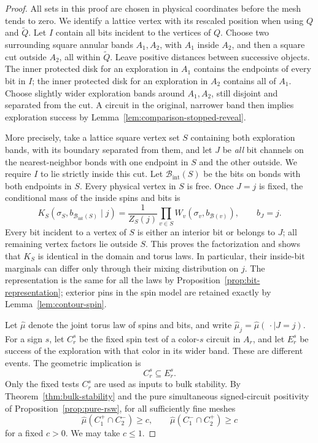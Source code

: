 \begin{proof}
All sets in this proof are chosen in physical coordinates before the
mesh tends to zero.  We identify a lattice vertex with its rescaled
position when using \(Q\) and \(\widetilde Q\).  Let \(I\) contain all
bits incident to the vertices of \(Q\).  Choose two surrounding square
annular bands \(A_1,A_2\), with \(A_1\) inside \(A_2\), and then a
square cut outside \(A_2\), all within \(\widetilde Q\).  Leave positive
distances between successive objects.  The inner protected disk for an
exploration in \(A_1\) contains the endpoints of every bit in \(I\);
the inner protected disk for an exploration in \(A_2\) contains all of
\(A_1\).  Choose slightly wider exploration bands around \(A_1,A_2\),
still disjoint and separated from the cut.  A circuit in the original,
narrower band then implies exploration success by
Lemma~\ref{lem:comparison-stopped-reveal}.

More precisely, take a lattice square vertex set \(S\) containing both
exploration bands, with its boundary separated from them, and let \(J\)
be \emph{all} bit channels on the
nearest-neighbor bonds with one endpoint in \(S\) and the other outside.
We require \(I\) to lie strictly inside this cut.  Let
\(\mathcal B_{\mathrm{int}}(S)\) be the bits on bonds with both endpoints
in \(S\).  Every physical vertex in \(S\) is free.  Once \(J=j\) is
fixed, the conditional mass of the inside spins and bits is
\[
 K_S(\sigma_S,b_{\mathcal B_{\mathrm{int}}(S)}\mid j)
 =\frac1{Z_S(j)}\prod_{v\in S}W_v(\sigma_v,b_{\mathcal B(v)}),
 \qquad b_J=j.
\]
Every bit incident to a vertex of \(S\) is either an interior bit or
belongs to \(J\); all remaining vertex factors lie outside \(S\).
This proves the factorization and shows that \(K_S\) is identical in
the domain and torus laws.  In particular, their inside-bit marginals
can differ only through their mixing distribution on \(j\).
The representation is the same for all the laws by
Proposition~\ref{prop:bit-representation}; exterior pins in the spin
model are retained exactly by Lemma~\ref{lem:contour-spin}.

Let \(\widehat\mu\) denote the joint torus law of spins and bits, and
write \(\widehat\mu_j=\widehat\mu(\,\cdot\mid J=j)\).  For a sign
\(s\), let \(C_r^s\) be the fixed spin test of a color-\(s\) circuit in
\(A_r\), and let \(E_r^s\) be success of the exploration with that
color in its wider band.  These are different events.  The geometric
implication is
\begin{equation}
 C_r^s\subseteq E_r^s.
 \label{eq:comparison-circuit-success}
\end{equation}
Only the fixed tests \(C_r^s\) are used as inputs to bulk stability.
By Theorem~\ref{thm:bulk-stability} and the pure simultaneous
signed-circuit positivity of Proposition~\ref{prop:pure-rsw}, for all
sufficiently fine meshes
\begin{equation}
 \widehat\mu(C_1^+\cap C_2^-)
 \ge c,\qquad
 \widehat\mu(C_1^-\cap C_2^+)\ge c
 \label{eq:comparison-two-circuit-positivity}
\end{equation}
for a fixed \(c>0\).  We may take \(c\le1\).


\end{proof}
